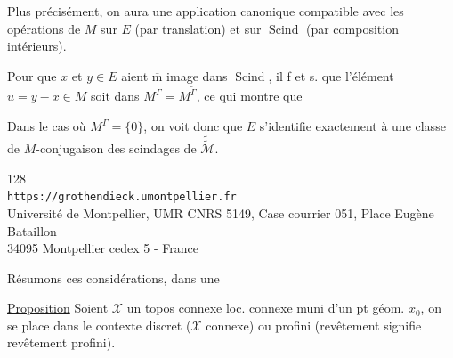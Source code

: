 Plus précisément, on aura une application canonique
compatible avec les opérations de $M$ sur $E$ (par translation) et sur $\operatorname{Scind}$ (par composition   intérieurs).

Pour que $x$ et $y\in E$ aient $\overline{\mathrm m}$ image dans $\operatorname{Scind}$, il f et s. que l'élément $u=y-x\in M$ soit dans $M^\Gamma=M^{\widetilde\Gamma}$, ce qui montre que
\diagram{
\[
\begin{tikzcd}[column sep=large,row sep=large]
\text{l'hom }E \arrow[r,no head] & \operatorname{Scind}\text{ est injectif} \\
& \text{sss}\quad M^\Gamma=\{0\}\quad .
\end{tikzcd}
\tag{286}
\]
}

Dans le cas où $M^\Gamma=\{0\}$, on voit donc que $E$ s'identifie exactement à une classe de $M$-conjugaison des scindages de $\widetilde{\widetilde{\mathcal M}}$.


\begin{center}
\small
128\\
\texttt{https://grothendieck.umontpellier.fr}\\
Université de Montpellier, UMR CNRS 5149, Case courrier 051, Place Eugène Bataillon\\
34095 Montpellier cedex 5 - France
\end{center}


Résumons ces considérations, dans une

\uline{Proposition} Soient $\mathcal X$ un topos  connexe loc. connexe muni d'un pt géom. $x_0$, on se place dans le contexte discret ($\mathcal X$   connexe) ou profini (revêtement signifie revêtement profini).

